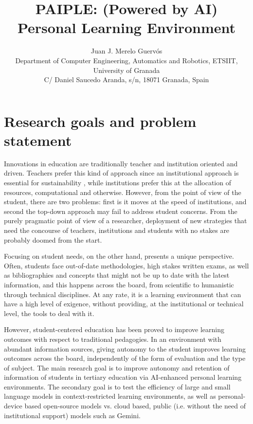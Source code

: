 \documentclass[a4paper,12pt]{article}
\title{PAIPLE: (Powered by AI) Personal Learning Environment}
\author{Juan J. Merelo Guervós\\
\footnotesize Department of Computer Engineering, Automatics
and Robotics, ETSIIT, University of Granada\\
\footnotesize C/ Daniel Saucedo
  Aranda, s/n, 18071 Granada, Spain}
\date{}
\begin{document}
\maketitle


\section{Research goals and problem statement}

Innovations in education are traditionally teacher and institution oriented and
driven. Teachers prefer this kind of approach since an institutional approach is
essential for sustainability \cite{DBLP:journals/eait/MereloCMBAGT24}, while
institutions prefer this at the allocation of resources, computational and
otherwise. However, from the point of view of the student, there are two
problems: first is it moves at the speed of institutions, and second the
top-down approach may fail to address student concerns. From the purely
pragmatic point of view of a researcher, deployment of new strategies that need
the concourse of teachers, institutions and students with no stakes are probably
doomed from the start.

Focusing on student needs, on the other hand, presents a unique
perspective. Often, students face out-of-date methodologies, high stakes written
exams, as well as bibliographies and concepts that might not be up to date with
the latest information, and this happens across the board, from scientific to
humanistic through technical disciplines. At any rate, it is a learning
environment that can have a high level of exigence, without providing, at the
institutional or technical level, the tools to deal with it.

However, student-centered education has been proved to improve learning
outcomes \cite{kaput2018evidence} with respect to traditional pedagogies. In an
environment with abundant information sources, giving autonomy to the student
improves learning outcomes across the board, independently of the form of
evaluation and the type of subject. The main research goal is to improve
autonomy and retention of information of students in tertiary education via
AI-enhanced personal learning environments. The secondary goal is to test the
efficiency of large and small language models in context-restricted learning
environments, as well as personal-device based open-source models vs. cloud
based, public (i.e. without the need of institutional support) models such as
Gemini.
\end{document}
